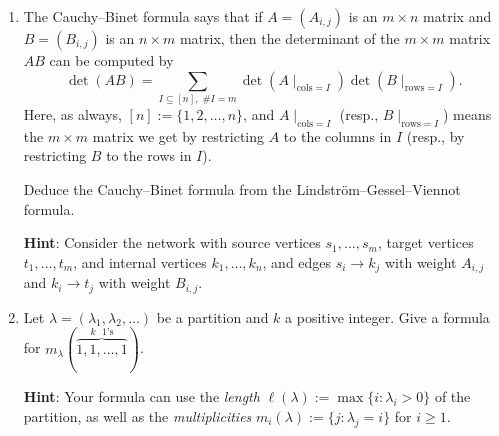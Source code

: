 \documentclass[11pt]{article}
\begin{document}
\begin{enumerate}
\item The Cauchy--Binet formula says that if $A=(A_{i,j})$ is an $m \times n$ matrix and $B=(B_{i,j})$ is an $n\times m$ matrix, then the determinant of the $m \times m$ matrix $AB$ can be computed by
\[ \det(AB) = \sum_{I \subseteq [n], \; \#I = m} \det(A\mid_{\mathrm{cols}=I})  \det(B\mid_{\mathrm{rows}=I}). \]
Here, as always, $[n] := \{1,2,\ldots,n\}$, and $A\mid_{\mathrm{cols}=I}$ (resp., $B\mid_{\mathrm{rows}=I}$) means the $m\times m$ matrix we get by restricting $A$ to the columns in $I$ (resp., by restricting $B$ to the rows in $I$).

Deduce the Cauchy--Binet formula from the Lindstr\"{o}m--Gessel--Viennot formula.

{\bf Hint}: Consider the network with source vertices $s_1,\ldots,s_m$, target vertices $t_1,\ldots,t_m$, and internal vertices $k_1,\ldots, k_n$, and edges $s_i \to k_j$ with weight $A_{i,j}$ and $k_i \to t_j$ with weight $B_{i,j}$.

\item Let $\lambda=(\lambda_1,\lambda_2,\ldots)$ be a partition and $k$ a positive integer. Give a formula for $m_{\lambda}(\overbrace{1,1,\ldots,1}^{\textrm{$k$ $1$'s}})$.

{\bf Hint}: Your formula can use the \emph{length} $\ell(\lambda) := \max \{ i\colon \lambda_i > 0 \}$ of the partition, as well as the \emph{multiplicities} $m_i(\lambda) := \{j\colon \lambda_j = i\}$ for $i \geq 1$.

\end{enumerate}
\end{document}
